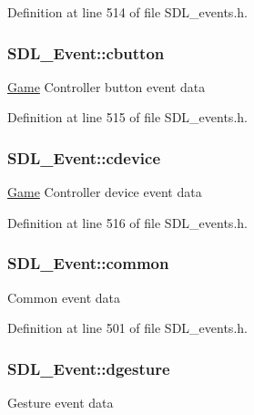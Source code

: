 Definition at line 514 of file S\+D\+L\+\_\+events.\+h.

\hypertarget{unionSDL__Event_aee2b5671c8dcdb447023715cc21593cb}{
\subsubsection[{cbutton}]{ S\+D\+L\+\_\+\+Event\+::cbutton}}\label{unionSDL__Event_aee2b5671c8dcdb447023715cc21593cb}
\hyperlink{classGame}{Game} Controller button event data 

Definition at line 515 of file S\+D\+L\+\_\+events.\+h.

\hypertarget{unionSDL__Event_ad3beed01e690b885728e0b0e1d636378}{
\subsubsection[{cdevice}]{ S\+D\+L\+\_\+\+Event\+::cdevice}}\label{unionSDL__Event_ad3beed01e690b885728e0b0e1d636378}
\hyperlink{classGame}{Game} Controller device event data 

Definition at line 516 of file S\+D\+L\+\_\+events.\+h.

\hypertarget{unionSDL__Event_abe5cb8767f93de55163c8ddd4562a7f2}{
\subsubsection[{common}]{ S\+D\+L\+\_\+\+Event\+::common}}\label{unionSDL__Event_abe5cb8767f93de55163c8ddd4562a7f2}
Common event data 

Definition at line 501 of file S\+D\+L\+\_\+events.\+h.

\hypertarget{unionSDL__Event_a4481167b9f8549aeb254e97ca812e74d}{
\subsubsection[{dgesture}]{ S\+D\+L\+\_\+\+Event\+::dgesture}}\label{unionSDL__Event_a4481167b9f8549aeb254e97ca812e74d}
Gesture event data 

